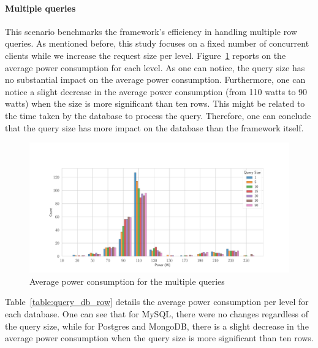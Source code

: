 \paragraph{Multiple queries}
This scenario benchmarks the framework's efficiency in handling multiple row queries.
As mentioned before, this study focuses on a fixed number of concurrent clients while we increase the request size per level.
Figure~\ref{fig:av_power_query} reports on the average power consumption for each level.
As one can notice, the query size has no substantial impact on the average power consumption.
Furthermore, one can notice a slight decrease in the average power consumption (from 110 watts to 90 watts) when the size is more significant than ten rows.
This might be related to the time taken by the database to process the query.
Therefore, one can conclude that the query size has more impact on the database than the framework itself.

\begin{figure}[hbt]
    \centering
    \includegraphics[width=\textwidth,height=\textheight,keepaspectratio]{imgs/histogram_av_power_cpu_query}
    \caption{Average power consumption for the multiple queries }
    \label{fig:av_power_query}
\end{figure}

Table~\ref{table:query_db_row} details the average power consumption per level for each database.
One can see that for MySQL, there were no changes regardless of the query size, while for Postgres and MongoDB, there is a slight decrease in the average power consumption when the query size is more significant than ten rows.

